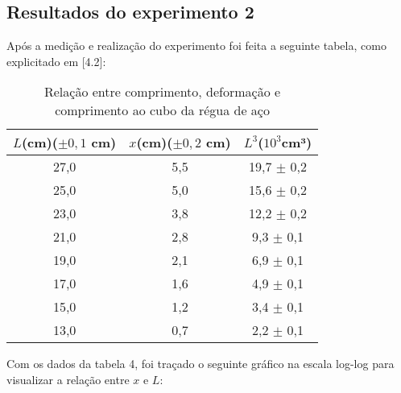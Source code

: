 \documentclass{article}
\begin{document}
\subsection{Resultados do experimento 2}
Após a medição e realização do experimento foi feita a seguinte tabela, como explicitado em [4.2]:
\begin{table}[!h]
    \centering
    \caption{Relação entre comprimento, deformação e comprimento ao cubo da régua de aço}
    \begin{tabular}{| c | c | c |}
    \hline
        $L$(cm)($\pm 0,1$ cm) & $x$(cm)($\pm 0,2$ cm) & $L^3$($10^{3}$cm³)\\
         \hline
         27,0 & 5,5 & 19,7 $\pm$ 0,2\\
         \hline
         25,0 & 5,0 & 15,6 $\pm$ 0,2\\
         \hline
         23,0 & 3,8 & 12,2 $\pm$ 0,2\\
         \hline
         21,0 & 2,8 & 9,3 $\pm$ 0,1\\
         \hline
         19,0 & 2,1 & 6,9 $\pm$ 0,1\\
         \hline
         17,0 & 1,6 & 4,9 $\pm$ 0,1\\
         \hline
         15,0 & 1,2 & 3,4 $\pm$ 0,1\\
         \hline
         13,0 & 0,7 & 2,2 $\pm$ 0,1\\
         \hline
    \end{tabular}
    \label{tab:tab3}
\end{table}

Com os dados da tabela 4, foi traçado o seguinte gráfico na escala log-log para visualizar a relação entre $x$ e $L$: \\
\end{document}
